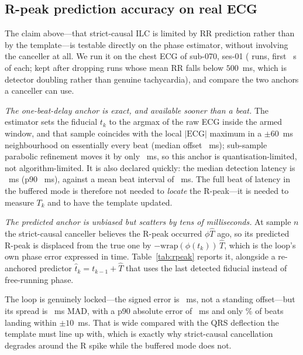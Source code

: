\documentclass[11pt]{article}
\begin{document}
\subsection{R-peak prediction accuracy on real ECG}
\label{sec:rpeak_prediction}

The claim above---that strict-causal ILC is limited by RR prediction rather than by the
template---is testable directly on the phase estimator, without involving the canceller at all. We
run it on the chest ECG of sub-070, ses-01 (\rpNrunsAll{} runs, first \rpDur{}~s of each;
\rpNruns{} kept after dropping runs whose mean RR falls below $500$~ms, which is detector doubling
rather than genuine tachycardia), and compare the two anchors a canceller can use.

\emph{The one-beat-delay anchor is exact, and available sooner than a beat.} The estimator sets the
fiducial $t_k$ to the argmax of the raw ECG inside the armed window, and that sample coincides with
the local $|\mathrm{ECG}|$ maximum in a $\pm 60$~ms neighbourhood on essentially every beat (median
offset \rpFidOff{}~ms); sub-sample parabolic refinement moves it by only \rpSub{}~ms, so this anchor
is quantisation-limited, not algorithm-limited. It is also declared quickly: the median detection
latency is \rpLat{}~ms (p90 \rpLatPninety{}~ms), against a mean beat interval of \rpRR{}~ms. The
full beat of latency in the buffered mode is therefore not needed to \emph{locate} the R-peak---it
is needed to measure $T_k$ and to have the template updated.

\emph{The predicted anchor is unbiased but scatters by tens of milliseconds.} At sample $n$ the
strict-causal canceller believes the R-peak occurred $\phi\hat{T}$ ago, so its predicted R-peak is
displaced from the true one by $-\mathrm{wrap}(\phi(t_k))\,\hat{T}$, which is the loop's own phase
error expressed in time. Table~\ref{tab:rpeak} reports it, alongside a re-anchored predictor
$\hat{t}_k = t_{k-1} + \hat{T}$ that uses the last detected fiducial instead of free-running phase.



The loop is genuinely locked---the signed error is \rpPllBias{}~ms, not a standing offset---but its
spread is \rpPllMad{}~ms MAD, with a p90 absolute error of \rpPllPninety{}~ms and only
\rpPllWTen\% of beats landing within $\pm 10$~ms. That is wide compared with the QRS deflection
the template must line up with, which is exactly why strict-causal cancellation degrades around the
R spike while the buffered mode does not.
\end{document}
